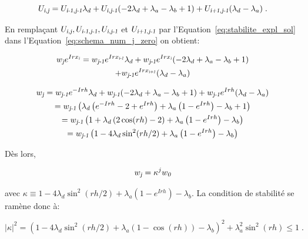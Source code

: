 \documentclass[a4paper, 12pt]{report}
\begin{document}
\begin{equation}
  U_{\textsl{i},\textsl{j}} = U_{\textsl{i-1},\textsl{j-1}} \lambda_d + U_{\textsl{i},\textsl{j-1}} (-2 \lambda_d + \lambda_a - \lambda_b +1) + U_{\textsl{i+1}, \textsl{j-1}} (\lambda_d - \lambda_a)\;.
  \label{eq:schema_num_j_zero}
\end{equation}

En remplaçant $U_{\textsl{i},\textsl{j}}, U_{\textsl{i-1},\textsl{j-1}}, U_{\textsl{i},\textsl{j-1}}$ et $U_{\textsl{i+1},\textsl{j-1}}$
par l'Equation~\ref{eq:stabilite_expl_sol}
dans l'Equation~\ref{eq:schema_num_j_zero} on obtient:

\begin{multline}
  w_{\textsl{j}} e^{Irx_{\textsl{i}}} = w_{\textsl{j-1}} e^{Irx_{\textsl{i-1}}}
  \lambda_d + w_{\textsl{j-1}} e^{Irx_{\textsl{i}}} (-2 \lambda_d + \lambda_a - \lambda_b +1)\\
  + w_{\textsl{j-1}} e^{Irx_{\textsl{i+1}}} (\lambda_d - \lambda_a)
\end{multline}

\begin{multline}
  w_{\textsl{j}} = w_{\textsl{j-1}} e^{-Irh} \lambda_d
  + w_{\textsl{j-1}} (-2 \lambda_d + \lambda_a - \lambda_b +1)
  + w_{\textsl{j-1}} e^{Irh} (\lambda_d - \lambda_a)\\
  = w_{\textsl{j-1}} \left ( \lambda_d \left ( e^{-Irh} -2 + e^{Irh} \right )
  + \lambda_a \left (1- e^{Irh} \right ) - \lambda_b + 1\right )\\
  = w_{\textsl{j-1}} \left ( 1 + \lambda_d \left (2\cos(rh) -2  \right )
  + \lambda_a \left (1- e^{Irh} \right ) - \lambda_b \right )\\
  = w_{\textsl{j-1}} \left ( 1 - 4 \lambda_d \sin^2(rh/2)
  + \lambda_a \left (1- e^{Irh} \right ) - \lambda_b \right )
\end{multline}

Dès lors,

\begin{equation}
  w_{\textsl{j}} = \kappa^j w_{\textsl{0}}
\end{equation}

avec $\kappa \equiv  1 - 4 \lambda_d \sin^2(rh/2) + \lambda_a \left (1- e^{Irh} \right ) - \lambda_b$.
La condition de stabilité se ramène donc à:

\begin{equation}
|\kappa|^2 = \left ( 1 - 4 \lambda_d \sin^2(rh/2) + \lambda_a \left (1- \cos(rh) \right ) - \lambda_b \right )^2+ \lambda_a^2 \sin^2(rh) \le 1\;.
\end{equation}
\end{document}
